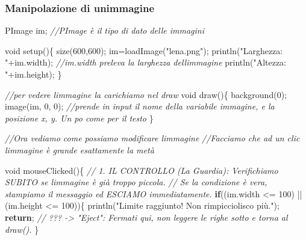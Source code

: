 \documentclass[
]{article}
\newenvironment{Shaded}{}{}
\newcommand{\CommentTok}[1]{\textcolor[rgb]{0.38,0.63,0.69}{\textit{#1}}}
\newcommand{\ControlFlowTok}[1]{\textcolor[rgb]{0.00,0.44,0.13}{\textbf{#1}}}
\newcommand{\DataTypeTok}[1]{\textcolor[rgb]{0.56,0.13,0.00}{#1}}
\newcommand{\DecValTok}[1]{\textcolor[rgb]{0.25,0.63,0.44}{#1}}
\newcommand{\FunctionTok}[1]{\textcolor[rgb]{0.02,0.16,0.49}{#1}}
\newcommand{\NormalTok}[1]{#1}
\newcommand{\OperatorTok}[1]{\textcolor[rgb]{0.40,0.40,0.40}{#1}}
\newcommand{\StringTok}[1]{\textcolor[rgb]{0.25,0.44,0.63}{#1}}
\begin{document}
\subsubsection{Manipolazione di
un\textquotesingle immagine}\label{manipolazione-di-unimmagine}

\begin{Shaded}
\begin{Highlighting}[]
\NormalTok{PImage im}\OperatorTok{;} \CommentTok{//PImage è il tipo di dato delle immagini}

\DataTypeTok{void} \FunctionTok{setup}\OperatorTok{()\{}
  \FunctionTok{size}\OperatorTok{(}\DecValTok{600}\OperatorTok{,}\DecValTok{600}\OperatorTok{);}
\NormalTok{  im}\OperatorTok{=}\FunctionTok{loadImage}\OperatorTok{(}\StringTok{"lena.png"}\OperatorTok{);}
  \FunctionTok{println}\OperatorTok{(}\StringTok{"Larghezza: "}\OperatorTok{+}\NormalTok{im}\OperatorTok{.}\FunctionTok{width}\OperatorTok{);} \CommentTok{//im.width preleva la larghezza dell\textquotesingle{}immagine}
  \FunctionTok{println}\OperatorTok{(}\StringTok{"Altezza: "}\OperatorTok{+}\NormalTok{im}\OperatorTok{.}\FunctionTok{height}\OperatorTok{);}
\OperatorTok{\}}

\CommentTok{//per vedere l\textquotesingle{}immagine la carichiamo nel draw}
\DataTypeTok{void} \FunctionTok{draw}\OperatorTok{()\{}
  \FunctionTok{background}\OperatorTok{(}\DecValTok{0}\OperatorTok{);}
  \FunctionTok{image}\OperatorTok{(}\NormalTok{im}\OperatorTok{,} \DecValTok{0}\OperatorTok{,} \DecValTok{0}\OperatorTok{);} \CommentTok{//prende in input il nome della variabile immagine, e la posizione x, y. Un po\textquotesingle{} come per il testo}
\OperatorTok{\}}

\CommentTok{//Ora vediamo come possiamo modificare l\textquotesingle{}immagine}
\CommentTok{//Facciamo che ad un clic l\textquotesingle{}immagine è grande esattamente la metà}

\DataTypeTok{void} \FunctionTok{mouseClicked}\OperatorTok{()\{}
  \CommentTok{// 1. IL CONTROLLO (La Guardia): Verifichiamo SUBITO se l\textquotesingle{}immagine è già troppo piccola.}
  \CommentTok{// Se la condizione è vera, stampiamo il messaggio ed ESCIAMO immediatamente.}
  \ControlFlowTok{if}\OperatorTok{((}\NormalTok{im}\OperatorTok{.}\FunctionTok{width} \OperatorTok{\textless{}=} \DecValTok{100}\OperatorTok{)} \OperatorTok{||} \OperatorTok{(}\NormalTok{im}\OperatorTok{.}\FunctionTok{height} \OperatorTok{\textless{}=} \DecValTok{100}\OperatorTok{))\{}
    \FunctionTok{println}\OperatorTok{(}\StringTok{"Limite raggiunto! Non rimpicciolisco più."}\OperatorTok{);}
    \ControlFlowTok{return}\OperatorTok{;} \CommentTok{// ??? {-}\textgreater{} "Eject": Fermati qui, non leggere le righe sotto e torna al draw().}
  \OperatorTok{\}}


\end{Highlighting}
\end{Shaded}
\end{document}
